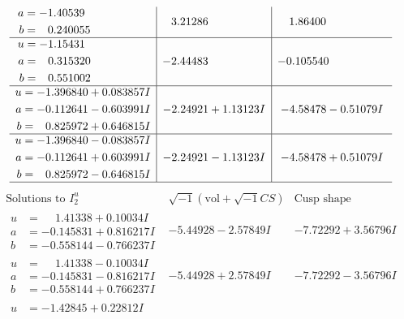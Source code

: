\documentclass[1p]{elsarticle_modified}
\theoremstyle{definition}
\newcommand{\I}{\sqrt{-1}}
\begin{document}
$$\begin{array}{c|c|c}
\begin{aligned}
a &= -1.40539\phantom{ +0.000000I} \\
b &= \phantom{-}0.240055\phantom{ +0.000000I}\end{aligned}
 & \phantom{-}3.21286\phantom{ +0.000000I} & \phantom{-}1.86400\phantom{ +0.000000I} \\ \hline\begin{aligned}
u &= -1.15431\phantom{ +0.000000I} \\
a &= \phantom{-}0.315320\phantom{ +0.000000I} \\
b &= \phantom{-}0.551002\phantom{ +0.000000I}\end{aligned}
 & -2.44483\phantom{ +0.000000I} & -0.105540\phantom{ +0.000000I} \\ \hline\begin{aligned}
u &= -1.396840 + 0.083857 I \\
a &= -0.112641 - 0.603991 I \\
b &= \phantom{-}0.825972 + 0.646815 I\end{aligned}
 & -2.24921 + 1.13123 I & -4.58478 - 0.51079 I \\ \hline\begin{aligned}
u &= -1.396840 - 0.083857 I \\
a &= -0.112641 + 0.603991 I \\
b &= \phantom{-}0.825972 - 0.646815 I\end{aligned}
 & -2.24921 - 1.13123 I & -4.58478 + 0.51079 I\\
 \hline 
 \end{array}$$\newpage$$\begin{array}{c|c|c}  
\text{Solutions to }I^u_{2}& \I (\text{vol} + \sqrt{-1}CS) & \text{Cusp shape}\\
 \hline 
\begin{aligned}
u &= \phantom{-}1.41338 + 0.10034 I \\
a &= -0.145831 + 0.816217 I \\
b &= -0.558144 - 0.766237 I\end{aligned}
 & -5.44928 - 2.57849 I & -7.72292 + 3.56796 I \\ \hline\begin{aligned}
u &= \phantom{-}1.41338 - 0.10034 I \\
a &= -0.145831 - 0.816217 I \\
b &= -0.558144 + 0.766237 I\end{aligned}
 & -5.44928 + 2.57849 I & -7.72292 - 3.56796 I \\ \hline\begin{aligned}
u &= -1.42845 + 0.22812 I \\

\end{aligned}
\end{array}$$
\end{document}

